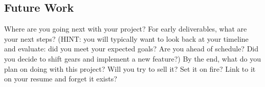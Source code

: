 \documentclass[10pt,conference,onecolumn,compsoc]{IEEEtran}
\begin{document}
\subsection{Future Work}
Where are you going next with your project?
For early deliverables, what are your next steps?  (HINT: you will typically want to look back at your timeline and evaluate: did you meet your expected goals?  Are you ahead of schedule?  Did you decide to shift gears and implement a new feature?)
By the end, what do you plan on doing with this project?  Will you try to sell it?  Set it on fire?  Link to it on your resume and forget it exists?

















\end{document}
